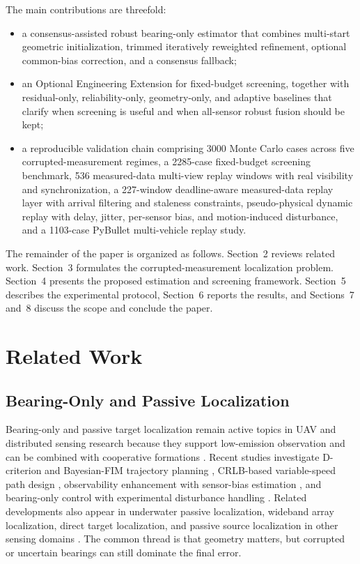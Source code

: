 \documentclass[drones,article,submit,pdftex,moreauthors]{Definitions/mdpi}
\begin{document}
The main contributions are threefold:
\begin{itemize}
\item a consensus-assisted robust bearing-only estimator that combines multi-start geometric initialization, trimmed iteratively reweighted refinement, optional common-bias correction, and a consensus fallback;
\item an Optional Engineering Extension for fixed-budget screening, together with residual-only, reliability-only, geometry-only, and adaptive baselines that clarify when screening is useful and when all-sensor robust fusion should be kept;
\item a reproducible validation chain comprising 3000 Monte Carlo cases across five corrupted-measurement regimes, a 2285-case fixed-budget screening benchmark, 536 measured-data multi-view replay windows with real visibility and synchronization, a 227-window deadline-aware measured-data replay layer with arrival filtering and staleness constraints, pseudo-physical dynamic replay with delay, jitter, per-sensor bias, and motion-induced disturbance, and a 1103-case PyBullet multi-vehicle replay study.
\end{itemize}

The remainder of the paper is organized as follows. Section~2 reviews related work. Section~3 formulates the corrupted-measurement localization problem. Section~4 presents the proposed estimation and screening framework. Section~5 describes the experimental protocol, Section~6 reports the results, and Sections~7 and~8 discuss the scope and conclude the paper.

\section{Related Work}

\subsection{Bearing-Only and Passive Localization}

Bearing-only and passive target localization remain active topics in UAV and distributed sensing research because they support low-emission observation and can be combined with cooperative formations \cite{li2025bearing,kang2024aoa,huang2025emcompat,xing2025node}. Recent studies investigate D-criterion and Bayesian-FIM trajectory planning \cite{zou2024revisit,dogancay2024bayesian}, CRLB-based variable-speed path design \cite{chen2025variable,peng2024trajectory}, observability enhancement with sensor-bias estimation \cite{wang2025bio}, and bearing-only control with experimental disturbance handling \cite{sui2024adaptive,dou2025moving}. Related developments also appear in underwater passive localization, wideband array localization, direct target localization, and passive source localization in other sensing domains \cite{mei2024bearing,zong2025distributed,yu2025passive,wu2026bearing,zeng2026three,zhou2026direct,chen2025research}. The common thread is that geometry matters, but corrupted or uncertain bearings can still dominate the final error.
\end{document}
